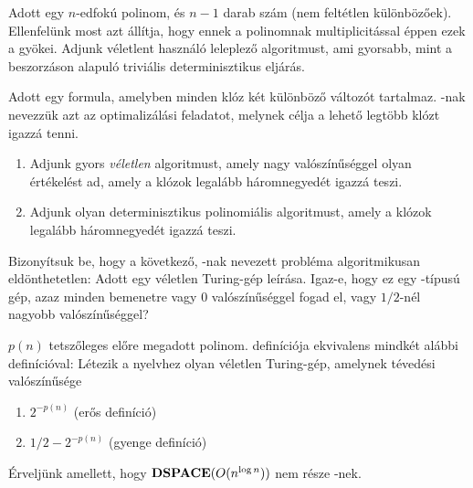 \begin{Exercise}[counter={sorszam}, difficulty=0]
\easy Adott egy $n$-edfokú polinom, és $n-1$ darab szám (nem feltétlen
különbözőek). Ellenfelünk most azt állítja, hogy ennek a polinomnak
multiplicitással éppen ezek a gyökei. Adjunk véletlent használó
leleplező algoritmust, ami gyorsabb, mint a beszorzáson alapuló
triviális determinisztikus eljárás.
\end{Exercise}


\begin{Exercise}[counter={sorszam}, difficulty=0]
Adott egy  formula, amelyben minden klóz két különböző változót
tartalmaz. -nak nevezzük azt az optimalizálási feladatot, melynek célja
a lehető legtöbb klózt igazzá tenni.
\begin{enumerate}
 \item Adjunk gyors \emph{véletlen} algoritmust, amely nagy
valószínűséggel olyan értékelést ad, amely a klózok legalább háromnegyedét
igazzá teszi.
 \item Adjunk olyan determinisztikus polinomiális
algoritmust, amely a klózok legalább háromnegyedét igazzá teszi.
\end{enumerate}
\end{Exercise}


\begin{Exercise}[counter={sorszam}, difficulty=0]
Bizonyítsuk be, hogy a következő, -nak nevezett probléma algoritmikusan
eldönthetetlen: Adott egy véletlen Turing-gép leírása. Igaz-e, hogy ez egy \RP-típusú
gép, azaz minden bemenetre vagy 0 valószínűséggel fogad el, vagy $1/2$-nél nagyobb
valószínűséggel?
\end{Exercise}


\begin{Exercise}[counter={sorszam}, difficulty=0]
$p(n)$ tetszőleges előre megadott polinom. \BPP definíciója ekvivalens mindkét alábbi
definícióval: Létezik a nyelvhez olyan véletlen Turing-gép, amelynek tévedési valószínűsége
\begin{enumerate}
 \item $2^{-p(n)}$ (erős \BPP definíció)
 \item $1/2-2^{-p(n)}$ (gyenge \BPP definíció)
\end{enumerate}
\end{Exercise}


\begin{Exercise}[counter={sorszam}, difficulty=0]
Érveljünk amellett, hogy $\mbox{\ensuremath{\mathbf{DSPACE}}}(O(n^{\log n}))$ nem része \BPP-nek. 


\end{Exercise}

